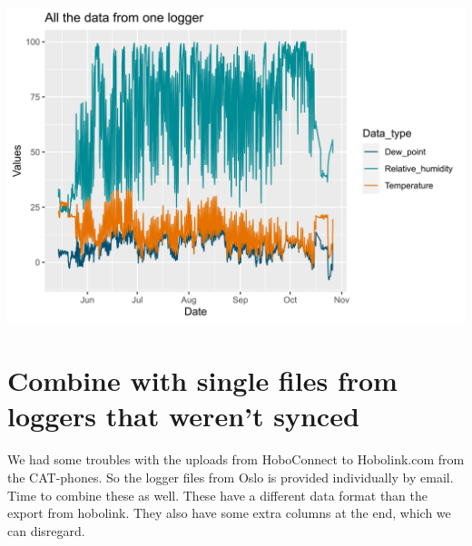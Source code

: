 \documentclass[]{article}
\begin{document}
\includegraphics{figure/unnamed-chunk-13-1.png}

\hypertarget{combine-with-single-files-from-loggers-that-werent-synced}{%
\section{Combine with single files from loggers that weren't
synced}\label{combine-with-single-files-from-loggers-that-werent-synced}}

We had some troubles with the uploads from HoboConnect to Hobolink.com
from the CAT-phones. So the logger files from Oslo is provided
individually by email. Time to combine these as well. These have a
different data format than the export from hobolink. They also have some
extra columns at the end, which we can disregard.
\end{document}
